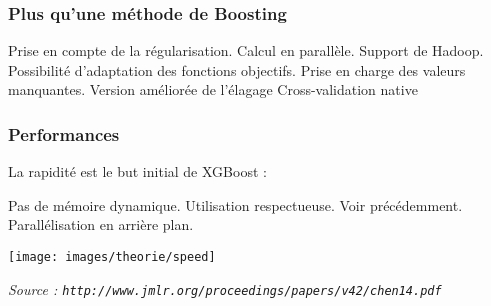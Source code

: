 \begin{frame}
	\frametitle{Plus qu'une méthode de Boosting}
	\begin{itemize}
		\itemperso{}Prise en compte de la régularisation.
		\itemperso{}Calcul en parallèle.
		\itemperso{}Support de Hadoop.
		\itemperso{}Possibilité d'adaptation des fonctions objectifs.
		\itemperso{}Prise en charge des valeurs manquantes.
		\itemperso{}Version améliorée de l'élagage
		\itemperso{}Cross-validation native
	\end{itemize}
\end{frame}

\begin{frame}
	\frametitle{Performances}
	La rapidité est le but initial de XGBoost :
	\begin{itemize}
		Pas de mémoire dynamique.
		Utilisation respectueuse.
		Voir précédemment.
		Parallélisation en arrière plan.
	\end{itemize}
	\rule{0pt}{0pt}\hfill\texttt{[image: images/theorie/speed]}\hfill\rule{0pt}{0pt}

	\rule{0pt}{0pt}\hfill{\fontsize{.15cm}{0cm}\selectfont\textit{Source : \texttt{http://www.jmlr.org/proceedings/papers/v42/chen14.pdf}}}
\end{frame}